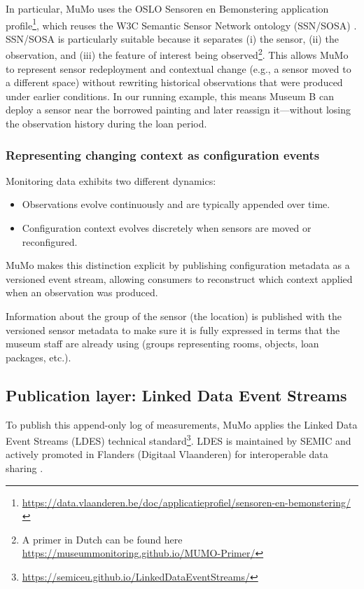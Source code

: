 \documentclass{ceurart}
\providecommand{\tightlist}{%
  \setlength{\itemsep}{0pt}\setlength{\parskip}{0pt}}
\begin{document}
In particular, MuMo uses the OSLO Sensoren en Bemonstering application
profile\footnote{\url{https://data.vlaanderen.be/doc/applicatieprofiel/sensoren-en-bemonstering/}},
which reuses the W3C Semantic Sensor Network ontology (SSN/SOSA)
\citep{compton2012ssn, ssn-sosa}. SSN/SOSA is particularly suitable
because it separates (i) the sensor, (ii) the observation, and (iii) the
feature of interest being
observed\footnote{A primer in Dutch can be found here \url{https://museummonitoring.github.io/MUMO-Primer/}}.
This allows MuMo to represent sensor redeployment and contextual change
(e.g., a sensor moved to a different space) without rewriting historical
observations that were produced under earlier conditions. In our running
example, this means Museum B can deploy a sensor near the borrowed
painting and later reassign it---without losing the observation history
during the loan period.

\subsubsection{Representing changing context as configuration
events}\label{representing-changing-context-as-configuration-events}

Monitoring data exhibits two different dynamics:

\begin{itemize}
\tightlist
\item
  Observations evolve continuously and are typically appended over time.
\item
  Configuration context evolves discretely when sensors are moved or
  reconfigured.
\end{itemize}

MuMo makes this distinction explicit by publishing configuration
metadata as a versioned event stream, allowing consumers to reconstruct
which context applied when an observation was produced.

Information about the group of the sensor (the location) is published
with the versioned sensor metadata to make sure it is fully expressed in
terms that the museum staff are already using (groups representing
rooms, objects, loan packages, etc.).

\subsection{Publication layer: Linked Data Event
Streams}\label{sec:ldes}

To publish this append-only log of measurements, MuMo applies the Linked
Data Event Streams (LDES) technical
standard\footnote{\url{https://semiceu.github.io/LinkedDataEventStreams/}}.
LDES is maintained by SEMIC and actively promoted in Flanders (Digitaal
Vlaanderen) for interoperable data sharing
\citep{semic_support_centre, vanlancker2021ldes}.
\end{document}
